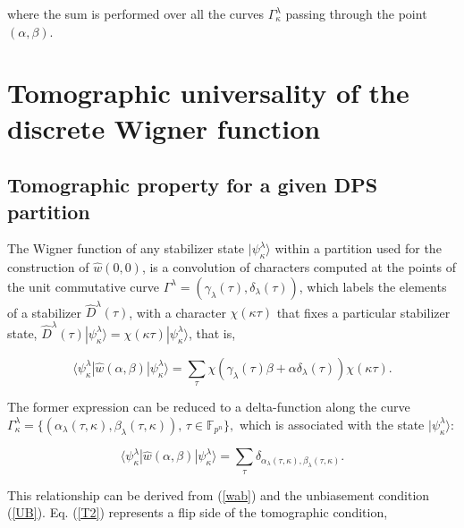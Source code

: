 \documentclass[quantumrep,article,submit,pdftex,moreauthors]{Definitions/mdpi}
\begin{document}
where the sum is performed over all the curves $\Gamma_{\kappa }^{\lambda }$
passing through the point $(\alpha,\beta)$. 

\section{Tomographic universality of the discrete Wigner function}

\subsection{Tomographic property for a given DPS partition}

The Wigner function of any stabilizer state $|\psi_{\kappa }^{\lambda}\rangle$
within a partition used for the construction of $\hat{w}\left(0,0\right)$, is a
convolution of characters computed at the points of the unit commutative curve
$\Gamma^{\lambda} = \left(\gamma_{\lambda}\left(\tau \right),
\delta_{\lambda}(\tau)\right)$, which labels the elements of a stabilizer
$\hat{D}^{\lambda}(\tau)$, with a character $\chi(\kappa \tau)$ that fixes a
particular stabilizer state, $\hat{D}^{\lambda}(\tau)|\psi_{\kappa
}^{\lambda}\rangle = \chi(\kappa \tau )|\psi_{\kappa}^{\lambda }\rangle$, that
is,

\begin{equation}
  \langle \psi_{\kappa }^{\lambda }
  |\hat{w}\left(\alpha,\beta\right)
  |\psi_{\kappa }^{\lambda }\rangle
  = \sum_{\tau } \chi\left(
    \gamma_{\lambda}(\tau) \beta + \alpha \delta_{\lambda}(\tau)
  \right)
  \chi(\kappa \tau).
  \label{T1}
\end{equation}

The former expression can be reduced to a delta-function along the curve
$\Gamma_{\kappa}^{\lambda} = \{(\alpha_{\lambda}(\tau,\kappa),
\beta_{\lambda}(\tau,\kappa)), \, \tau \in \mathbb{F}_{p^{n}}\},$ which is
associated with the state $|\psi_{\kappa}^{\lambda}\rangle$:

\begin{equation}
  \langle \psi_{\kappa }^{\lambda }
  |\hat{w}\left(\alpha,\beta\right)
  |\psi_{\kappa}^{\lambda}\rangle
  = \sum_{\tau}
  \delta_{\alpha_{\lambda}(\tau,\kappa), \beta_{\lambda}(\tau,\kappa )}.
  \label{T2}
\end{equation}

This relationship can be derived from (\ref{wab}) and the unbiasement
condition (\ref{UB}). Eq. (\ref{T2}) represents a flip side of the
tomographic condition,
\end{document}
